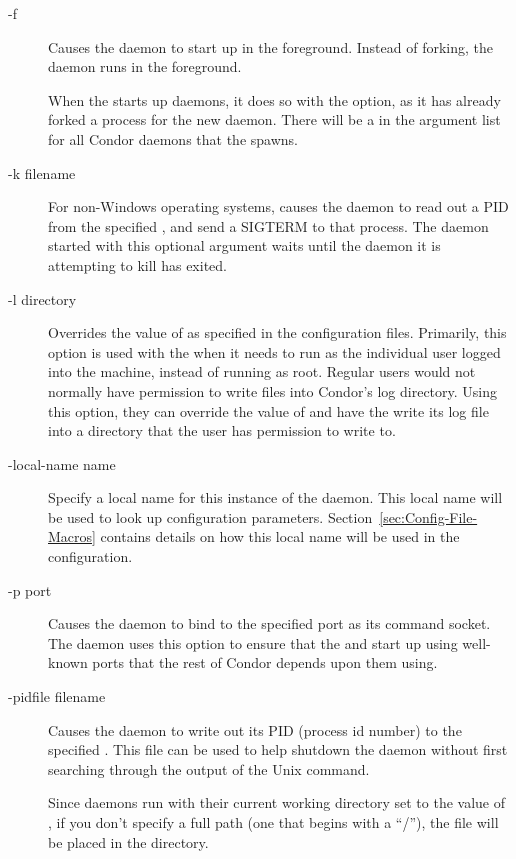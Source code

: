 \begin{description}
\item[-f] Causes the daemon to start up in the foreground.  Instead of
  forking, the daemon runs in the foreground.  

  \Note When the  starts up daemons, it does
  so with the  option, as it has already forked a process for the
  new daemon.  There will be a  in the argument list for all
  Condor daemons that the  spawns.

\item[-k filename] For non-Windows operating systems,
  causes the daemon to read out a PID from the
  specified , and send a SIGTERM to that process.
  The daemon started with this optional argument waits until the
  daemon it is attempting to kill has exited.  

\item[-l directory] Overrides the value of  as specified in
  the configuration files.  Primarily, this option is used with the
   when it needs to run as the individual user logged
  into the machine, instead of running as root.  Regular users would
  not normally have permission to write files into Condor's log
  directory.  Using this option, they can override the value of
   and have the  write its log file into a
  directory that the user has permission to write to.

\item[-local-name name] Specify a local name for this instance of
  the daemon.  This local name will be used to look up
  configuration parameters. 
  Section~\ref{sec:Config-File-Macros} contains
  details on how this local name will be used in the configuration.

\item[-p port] Causes the daemon to bind to the specified port as its
  command socket.  The  daemon
  uses this option to ensure that the
   and  start up using
  well-known ports that the rest of Condor depends upon them using.

\item[-pidfile filename] Causes the daemon to write out its PID
  (process id number) to the specified .
  This file can be used to
  help shutdown the daemon without first searching through 
  the output of the Unix  command.

  Since daemons run with their current working directory set to the
  value of , if you don't specify a full path
  (one that begins with a ``/''),
  the file will be placed in the  directory.


\end{description}
